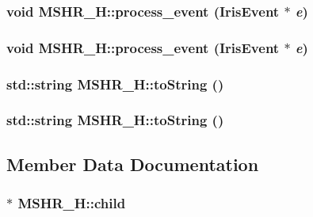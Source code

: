 \hypertarget{classMSHR__H_1dff946e7d92eae286b8f72df7dc0f03}{
\subsubsection[{process\_\-event}]{\setlength{\rightskip}{0pt plus 5cm}void MSHR\_\-H::process\_\-event ({\bf IrisEvent} $\ast$ {\em e})}}
\label{classMSHR__H_1dff946e7d92eae286b8f72df7dc0f03}


\hypertarget{classMSHR__H_1dff946e7d92eae286b8f72df7dc0f03}{
\subsubsection[{process\_\-event}]{\setlength{\rightskip}{0pt plus 5cm}void MSHR\_\-H::process\_\-event ({\bf IrisEvent} $\ast$ {\em e})}}
\label{classMSHR__H_1dff946e7d92eae286b8f72df7dc0f03}


\hypertarget{classMSHR__H_778e0a25bf58c2ccbe506a4c635f953f}{
\subsubsection[{toString}]{\setlength{\rightskip}{0pt plus 5cm}std::string MSHR\_\-H::toString ()}}
\label{classMSHR__H_778e0a25bf58c2ccbe506a4c635f953f}


\hypertarget{classMSHR__H_778e0a25bf58c2ccbe506a4c635f953f}{
\subsubsection[{toString}]{\setlength{\rightskip}{0pt plus 5cm}std::string MSHR\_\-H::toString ()}}
\label{classMSHR__H_778e0a25bf58c2ccbe506a4c635f953f}




\subsection{Member Data Documentation}
\hypertarget{classMSHR__H_66d8569d9e2ea71eb62ef9478761db02}{
\subsubsection[{child}]{ $\ast$ {\bf MSHR\_\-H::child}}}
\label{classMSHR__H_66d8569d9e2ea71eb62ef9478761db02}


